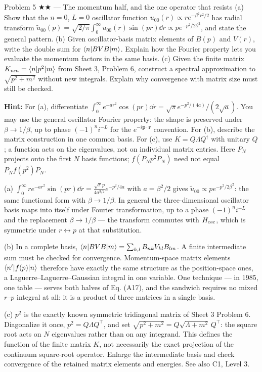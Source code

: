\documentclass[11pt]{article}
\begin{document}
\begin{problem}{Problem 5 ★★ — The momentum half, and the one operator that resists}
(a) Show that the $n=0$, $L=0$ oscillator function
$u_{00}(r)\propto re^{-\beta^2r^2/2}$ has radial transform
$\widetilde u_{00}(p)=\sqrt{2/\pi}\int_0^\infty u_{00}(r)\sin(pr)\dd r
\propto pe^{-p^2/2\beta^2}$, and state the general pattern.
(b) Given oscillator-basis matrix elements of $B(p)$ and $V(r)$,
write the double sum for $\langle n\rvert BVB\lvert m\rangle$. Explain how the Fourier property
lets you evaluate the momentum factors in the same basis.
(c) Given the finite matrix $K_{nm}=\langle n\rvert p^2\lvert m\rangle$ from Sheet 3,
Problem 6, construct a spectral approximation to $\sqrt{p^2+m^2}$ without
new integrals. Explain why convergence with matrix size must still be checked.

\textbf{Hint:} For (a), differentiate
$\int_0^\infty e^{-ar^2}\cos(pr)\dd r=\sqrt\pi e^{-p^2/(4a)}/(2\sqrt a)$.
You may use the general oscillator Fourier property: the shape is preserved
under $\beta\to1/\beta$, up to phase $(-1)^n i^{-L}$ for the
$e^{-i\bm p\cdot\bm r}$ convention. For (b), describe the matrix construction
in one common basis. For (c), use $K=Q\Lambda Q^\dagger$ with unitary $Q$;
a function acts on the eigenvalues, not on individual matrix entries.
Here $P_N$ projects onto the first $N$ basis functions;
$f(P_Np^2P_N)$ need not equal $P_Nf(p^2)P_N$.
\end{problem}
\begin{solution}
(a) $\int_0^\infty re^{-ar^2}\sin(pr)\dd r=\tfrac{\sqrt\pi p}{4a^{3/2}}e^{-p^2/4a}$
with $a=\beta^2/2$ gives $\widetilde u_{00}\propto pe^{-p^2/2\beta^2}$: the same
functional form with $\beta\to1/\beta$. In general the three-dimensional
oscillator basis maps into itself under Fourier transformation, up to a phase
$(-1)^n i^{-L}$ and the replacement $\beta\to1/\beta$ --- the transform commutes
with $H_{\rm osc}$, which is symmetric under $r\leftrightarrow p$ at that
substitution.

(b) In a complete basis,
$\langle n\rvert BVB\lvert m\rangle=\sum_{k,l}B_{nk}V_{kl}B_{lm}$.
A finite intermediate sum must be checked for convergence.
Momentum-space matrix elements $\langle n'\rvert f(p)\lvert n\rangle$ therefore have exactly
the same structure as the position-space ones, a Laguerre--Laguerre--Gaussian
integral in one variable. One technique --- in 1985, one table --- serves both
halves of Eq. (A17), and the sandwich requires no mixed $r$--$p$ integral at
all: it is a product of three matrices in a single basis.

(c) $p^2$ is the exactly known symmetric tridiagonal matrix of Sheet 3
Problem 6. Diagonalize it once, $p^2=Q\Lambda Q^{\!\top}$, and set
$\sqrt{p^2+m^2}=Q\sqrt{\Lambda+m^2}\,Q^{\!\top}$: the square root acts on $N$
eigenvalues rather than on any integrand. This defines the function of the
finite matrix $K$, not necessarily the exact projection of the continuum
square-root operator. Enlarge the intermediate basis and check convergence of
the retained matrix elements and energies. See also C1, Level 3.
\end{solution}
\end{document}
